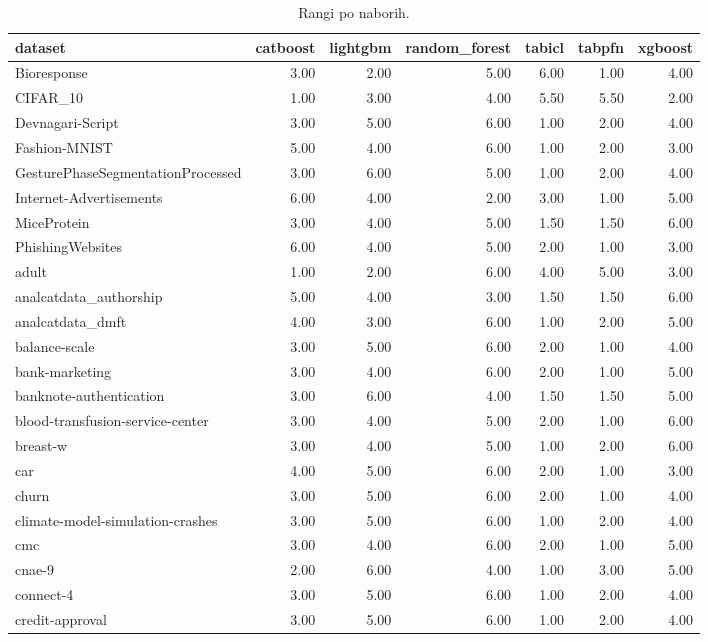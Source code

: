\begin{table}[htbp]
\centering
\caption{Rangi po naborih.}
\label{tab:ranks}
\begin{tabular}{lrrrrrr}
\hline
dataset & catboost & lightgbm & random\_forest & tabicl & tabpfn & xgboost \\
\hline
Bioresponse & 3.00 & 2.00 & 5.00 & 6.00 & 1.00 & 4.00 \\
CIFAR\_10 & 1.00 & 3.00 & 4.00 & 5.50 & 5.50 & 2.00 \\
Devnagari-Script & 3.00 & 5.00 & 6.00 & 1.00 & 2.00 & 4.00 \\
Fashion-MNIST & 5.00 & 4.00 & 6.00 & 1.00 & 2.00 & 3.00 \\
GesturePhaseSegmentationProcessed & 3.00 & 6.00 & 5.00 & 1.00 & 2.00 & 4.00 \\
Internet-Advertisements & 6.00 & 4.00 & 2.00 & 3.00 & 1.00 & 5.00 \\
MiceProtein & 3.00 & 4.00 & 5.00 & 1.50 & 1.50 & 6.00 \\
PhishingWebsites & 6.00 & 4.00 & 5.00 & 2.00 & 1.00 & 3.00 \\
adult & 1.00 & 2.00 & 6.00 & 4.00 & 5.00 & 3.00 \\
analcatdata\_authorship & 5.00 & 4.00 & 3.00 & 1.50 & 1.50 & 6.00 \\
analcatdata\_dmft & 4.00 & 3.00 & 6.00 & 1.00 & 2.00 & 5.00 \\
balance-scale & 3.00 & 5.00 & 6.00 & 2.00 & 1.00 & 4.00 \\
bank-marketing & 3.00 & 4.00 & 6.00 & 2.00 & 1.00 & 5.00 \\
banknote-authentication & 3.00 & 6.00 & 4.00 & 1.50 & 1.50 & 5.00 \\
blood-transfusion-service-center & 3.00 & 4.00 & 5.00 & 2.00 & 1.00 & 6.00 \\
breast-w & 3.00 & 4.00 & 5.00 & 1.00 & 2.00 & 6.00 \\
car & 4.00 & 5.00 & 6.00 & 2.00 & 1.00 & 3.00 \\
churn & 3.00 & 5.00 & 6.00 & 2.00 & 1.00 & 4.00 \\
climate-model-simulation-crashes & 3.00 & 5.00 & 6.00 & 1.00 & 2.00 & 4.00 \\
cmc & 3.00 & 4.00 & 6.00 & 2.00 & 1.00 & 5.00 \\
cnae-9 & 2.00 & 6.00 & 4.00 & 1.00 & 3.00 & 5.00 \\
connect-4 & 3.00 & 5.00 & 6.00 & 1.00 & 2.00 & 4.00 \\
credit-approval & 3.00 & 5.00 & 6.00 & 1.00 & 2.00 & 4.00 \\

\end{tabular}
\end{table}
